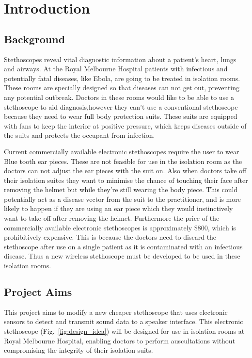 \chapter{Introduction}

\section{Background}
Stethoscopes reveal vital diagnostic information about a patient's heart, lungs and airways\cite{Grais2013}. At the Royal Melbourne Hospital patients with infectious and potentially fatal diseases, like Ebola, are going to be treated in isolation rooms. These rooms are specially designed so that diseases can not get out, preventing any potential outbreak. Doctors in these rooms would like to be able to use a stethoscope to aid diagnosis,however they can't use a conventional stethoscope because they need to wear full body protection suits. These suits are equipped with fans to keep the interior at positive pressure, which keeps diseases outside of the suits and protects the occupant from infection. 

Current commercially available electronic stethoscopes require the user to wear Blue tooth ear pieces. These are not feasible for use in the isolation room as the doctors can not adjust the ear pieces with the suit on. Also when doctors take off their isolation suites they want to minimise the chance of touching their face after removing the helmet but while they're still wearing the body piece. This could potentially act as a disease vector from the suit to the practitioner, and is more likely to happen if they are using an ear piece which they would instinctively want to take off after removing the helmet. Furthermore the price of the commercially available electronic stethoscopes is approximately \$800, which is prohibitively expensive. This is because the doctors need to discard the stethoscope after use on a single patient as it is contaminated with an infectious disease. Thus a new wireless stethoscope must be developed to be used in these isolation rooms.

\section{Project Aims}
This project aims to modify a new cheaper stethoscope that uses electronic sensors to detect and transmit sound data to a speaker interface. This electronic stethoscope (Fig.~\ref{fig:design_idea}) will be designed for use in isolation rooms at Royal Melbourne Hospital, enabling doctors to perform auscultations without compromising the integrity of their isolation suits. 

